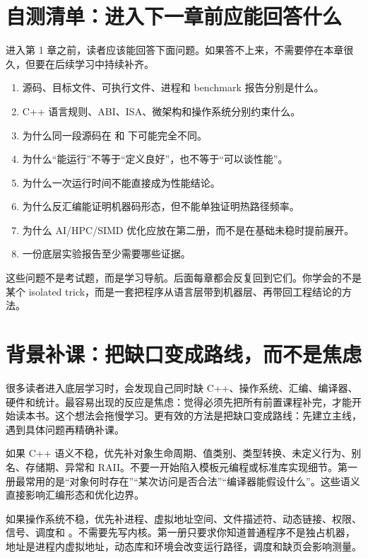 \section{自测清单：进入下一章前应能回答什么}

进入第 1 章之前，读者应该能回答下面问题。如果答不上来，不需要停在本章很久，但要在后续学习中持续补齐。

\begin{enumerate}
  \item 源码、目标文件、可执行文件、进程和 benchmark 报告分别是什么。
  \item C++ 语言规则、ABI、ISA、微架构和操作系统分别约束什么。
  \item 为什么同一段源码在  和  下可能完全不同。
  \item 为什么“能运行”不等于“定义良好”，也不等于“可以谈性能”。
  \item 为什么一次运行时间不能直接成为性能结论。
  \item 为什么反汇编能证明机器码形态，但不能单独证明热路径频率。
  \item 为什么 AI/HPC/SIMD 优化应放在第二册，而不是在基础未稳时提前展开。
  \item 一份底层实验报告至少需要哪些证据。
\end{enumerate}

这些问题不是考试题，而是学习导航。后面每章都会反复回到它们。你学会的不是某个 isolated trick，而是一套把程序从语言层带到机器层、再带回工程结论的方法。

\section{背景补课：把缺口变成路线，而不是焦虑}

很多读者进入底层学习时，会发现自己同时缺 C++、操作系统、汇编、编译器、硬件和统计。最容易出现的反应是焦虑：觉得必须先把所有前置课程补完，才能开始读本书。这个想法会拖慢学习。更有效的方法是把缺口变成路线：先建立主线，遇到具体问题再精确补课。

如果 C++ 语义不稳，优先补对象生命周期、值类别、类型转换、未定义行为、别名、存储期、异常和 RAII。不要一开始陷入模板元编程或标准库实现细节。第一册最常用的是“对象何时存在”“某次访问是否合法”“编译器能假设什么”。这些语义直接影响汇编形态和优化边界。

如果操作系统不稳，优先补进程、虚拟地址空间、文件描述符、动态链接、权限、信号、调度和 。不需要先写内核。第一册只要求你知道普通程序不是独占机器，地址是进程内虚拟地址，动态库和环境会改变运行路径，调度和缺页会影响测量。


